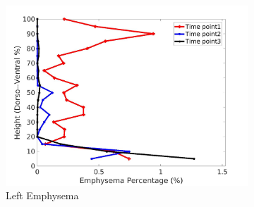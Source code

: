 \begin{figure}[H]
\begin{subfigure}{.42\linewidth}
  \includegraphics[width=\linewidth,trim={{.0\wd0} {.0\wd0} {.0\wd0} {.0\wd0}},clip]{Appendix/Image_AppexA/DorsoToVentral/IPF5LeftLungEmphysemaDiseaseDorsoToVentral.jpg} %
  \caption{Left Emphysema}
  \label{fig:IPF5DiseaseDorsoToVentral-g} 
\end{subfigure} 
\begin{subfigure}{.42\linewidth}%

\end{subfigure}
\end{figure}
